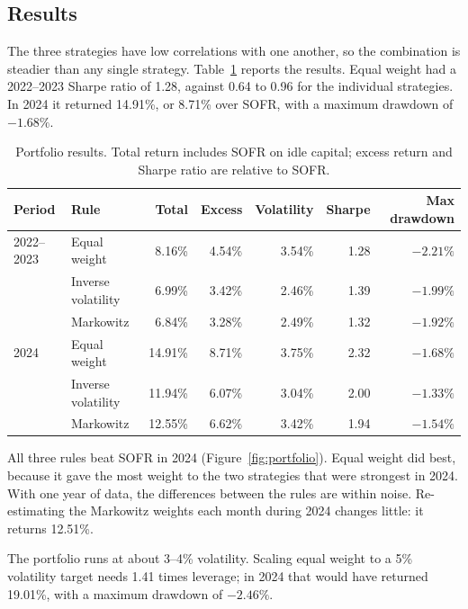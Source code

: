 \documentclass[main.tex]{subfiles}
\begin{document}
\subsection{Results}
The three strategies have low correlations with one another, so the combination is steadier than any single strategy. Table~\ref{tab:alloc} reports the results. Equal weight had a 2022--2023 Sharpe ratio of 1.28, against 0.64 to 0.96 for the individual strategies. In 2024 it returned 14.91\%, or 8.71\% over SOFR, with a maximum drawdown of $-1.68\%$.

\begin{table}[ht]\centering\small
\caption{Portfolio results. Total return includes SOFR on idle capital; excess return and Sharpe ratio are relative to SOFR.}\label{tab:alloc}
\begin{tabular}{llrrrrr}
\toprule
Period & Rule & Total & Excess & Volatility & Sharpe & Max drawdown \\
\midrule
2022--2023 & Equal weight & 8.16\% & 4.54\% & 3.54\% & 1.28 & $-2.21\%$ \\
 & Inverse volatility & 6.99\% & 3.42\% & 2.46\% & 1.39 & $-1.99\%$ \\
 & Markowitz & 6.84\% & 3.28\% & 2.49\% & 1.32 & $-1.92\%$ \\
\midrule
2024 & Equal weight & 14.91\% & 8.71\% & 3.75\% & 2.32 & $-1.68\%$ \\
 & Inverse volatility & 11.94\% & 6.07\% & 3.04\% & 2.00 & $-1.33\%$ \\
 & Markowitz & 12.55\% & 6.62\% & 3.42\% & 1.94 & $-1.54\%$ \\
\bottomrule
\end{tabular}
\end{table}


All three rules beat SOFR in 2024 (Figure~\ref{fig:portfolio}). Equal weight did best, because it gave the most weight to the two strategies that were strongest in 2024. With one year of data, the differences between the rules are within noise. Re-estimating the Markowitz weights each month during 2024 changes little: it returns 12.51\%.

The portfolio runs at about 3--4\% volatility. Scaling equal weight to a 5\% volatility target needs 1.41 times leverage; in 2024 that would have returned 19.01\%, with a maximum drawdown of $-2.46\%$.
\end{document}
